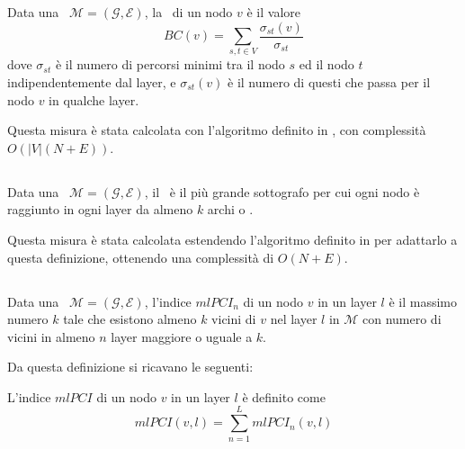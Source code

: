 \begin{definizione}[\verBetweennessCentrality]
    Data una \muln\ $\mathcal{M}=(\mathcal{G}, \mathcal{E})$, la 
    \verBetweennessCentrality\ di un nodo $v$ è il valore 
    \begin{equation}
        BC(v) = \sum_{s, t \in V} \frac{\sigma_{st}(v)}{\sigma_{st}}
    \end{equation}
    dove $\sigma_{st}$ è il numero di percorsi minimi tra il nodo $s$ ed il nodo $t$
    indipendentemente dal layer, e $\sigma_{st}(v)$ è il numero di questi che passa 
    per il nodo $v$ in qualche layer.
\end{definizione}

Questa misura è stata calcolata con l'algoritmo definito in \cite{dedomenico:verbetw}, 
con complessità $O\left(|V|\left(N+E\right)\right)$.

\subsection{\multiCore}

\begin{definizione}[\multiCore]
    Data una \muln\ $\mathcal{M}=(\mathcal{G}, \mathcal{E})$, il \multiCore\ è
    il più grande sottografo per cui ogni nodo è raggiunto in ogni layer da almeno $k$ archi o
    \interc.
\end{definizione}

Questa misura è stata calcolata estendendo l'algoritmo definito in \cite{batagelj:kcore} per 
adattarlo a questa definizione, ottenendo una complessità di $O(N + E)$.

\subsection{\PCI}
\begin{definizione}
    Data una \muln\ $\mathcal{M}=(\mathcal{G}, \mathcal{E})$, 
    l'indice $mlPCI_n$ di un nodo $v$ in un layer $l$ 
    è il massimo numero $k$ tale che esistono almeno $k$ vicini di $v$ nel layer $l$ in $\mathcal{M}$
    con numero di vicini in almeno $n$ layer maggiore o uguale a $k$.
\end{definizione}

Da questa definizione si ricavano le seguenti:

\begin{definizione}[\mlPCI]
    L'indice $mlPCI$ di un nodo $v$ in un layer $l$ è definito come 
    \begin{equation}
        mlPCI(v, l) = \sum_{n=1}^L mlPCI_n(v, l)
    \end{equation}
\end{definizione}

